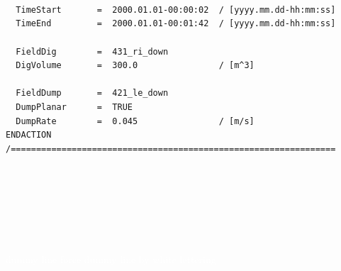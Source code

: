 \\ \hspace*{3mm} \texttt{\small{~~TimeStart~~~~~~~=~~2000.01.01-00:00:02~~/~[yyyy.mm.dd-hh:mm:ss]}}
\\ \hspace*{3mm} \texttt{\small{~~TimeEnd~~~~~~~~~=~~2000.01.01-00:01:42~~/~[yyyy.mm.dd-hh:mm:ss]}}
\\ \hspace*{3mm}
\\ \hspace*{3mm} \texttt{\small{~~FieldDig~~~~~~~~=~~431\_ri\_down}}
\\ \hspace*{3mm} \texttt{\small{~~DigVolume~~~~~~~=~~300.0~~~~~~~~~~~~~~~~/~[m\textasciicircum3]}}
\\ \hspace*{3mm}
\\ \hspace*{3mm} \texttt{\small{~~FieldDump~~~~~~~=~~421\_le\_down}}
\\ \hspace*{3mm} \texttt{\small{~~DumpPlanar~~~~~~=~~TRUE}}
\\ \hspace*{3mm} \texttt{\small{~~DumpRate~~~~~~~~=~~0.045~~~~~~~~~~~~~~~~/~[m/s]}}
\\ \hspace*{3mm} \texttt{\small{ENDACTION}}
\\ \hspace*{3mm} \texttt{\small{/================================================================}}
\\
\\
\\
\\
\\
\\
\\
\\
\textcolor{white}{dummy line force dummy line by white lettering} %


